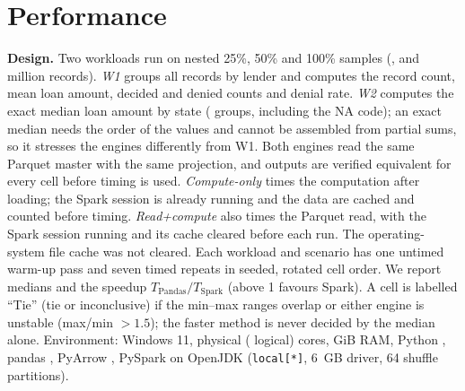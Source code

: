 \documentclass[acmtog,nonacm]{acmart}
\begin{document}
\section{Performance}\label{sec:perf}
\textbf{Design.} Two workloads run on nested 25\%, 50\% and 100\% samples (\RecMtwentyfive{}, \RecMfifty{} and \RecMhundred{} million records). \emph{W1} groups all records by lender and computes the record count, mean loan amount, decided and denied counts and denial rate. \emph{W2} computes the exact median loan amount by state (\WBNGroups{} groups, including the NA code); an exact median needs the order of the values and cannot be assembled from partial sums, so it stresses the engines differently from W1. Both engines read the same Parquet master with the same projection, and outputs are verified equivalent for every cell before timing is used. \emph{Compute-only} times the computation after loading; the Spark session is already running and the data are cached and counted before timing. \emph{Read+compute} also times the Parquet read, with the Spark session running and its cache cleared before each run. The operating-system file cache was not cleared. Each workload and scenario has one untimed warm-up pass and seven timed repeats in seeded, rotated cell order. We report medians and the speedup $T_\mathrm{Pandas}/T_\mathrm{Spark}$ (above 1 favours Spark). A cell is labelled ``Tie'' (tie or inconclusive) if the min--max ranges overlap or either engine is unstable (max/min $>1.5$); the faster method is never decided by the median alone. Environment: Windows 11, \CPUphys{} physical (\CPUlog{} logical) cores, \RAM{} GiB RAM, Python \PyVer, pandas \PandasVer, PyArrow \PyArrowVer, PySpark \SparkVer{} on OpenJDK \JavaVer{} (\texttt{local[*]}, 6~GB driver, 64 shuffle partitions).
\end{document}
